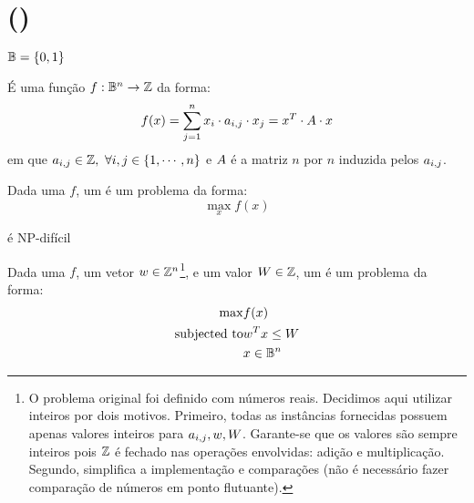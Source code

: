 \section{\maxkqbffull (\maxkqbf)}
\label{appendix:max-kqbf}

\begin{defn}
    $\mathbb{B} = \left\{0, 1\right\}$
\end{defn}

\begin{defn}
    É uma função $f: \mathbb{B}^n \rightarrow \mathbb{Z}$ da forma:
    $$
        f(x)
        = \displaystyle\sum\limits_{j = 1}^{n} x_i \cdot a_{i,j} \cdot x_j
        = x^{T} \cdot A \cdot x
    $$
    em que $a_{i,j} \in \mathbb{Z}, \ \forall i,j \in \left\{1, \cdots, n\right\}$ e $A$ é a matriz $n$ por $n$ induzida pelos $a_{i,j}$.
\end{defn}

\begin{defn}
Dada uma \qbf $f$, um \maxqbf é um problema da forma:
$$
    \max\limits_{x} f(x)
$$
\end{defn}

\begin{fact}
\maxqbf é NP-difícil \cite{bib:qbf}
\end{fact}

\begin{defn}
Dada uma \qbf $f$, um vetor $w \in \mathbb{Z}^n$\footnote{O problema original foi definido com números reais. Decidimos aqui utilizar inteiros por dois motivos. Primeiro, todas as instâncias fornecidas possuem apenas valores inteiros para $a_{i,j}, w, W$. Garante-se que os valores são sempre inteiros pois $\mathbb{Z}$ é fechado nas operações envolvidas: adição e multiplicação. Segundo, simplifica a implementação e comparações (não é necessário fazer comparação de números em ponto flutuante).}, e um valor $W \in \mathbb{Z}$, um \maxkqbf é um problema da forma:
\begin{eqnarray*}
    \max & f(x) \\
    \mbox{subjected to} & w^{T} x \leq W \\
    & x \in \mathbb{B}^n
\end{eqnarray*}
\end{defn}
